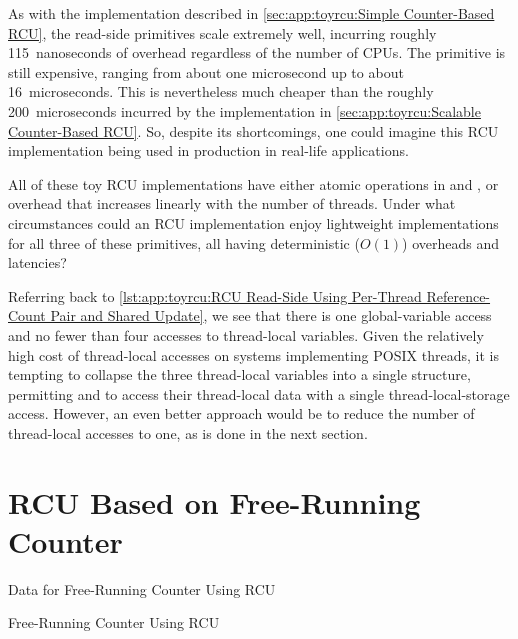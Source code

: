 As with the implementation described in
\cref{sec:app:toyrcu:Simple Counter-Based RCU},
the read-side primitives scale extremely well, incurring roughly
115~nanoseconds of overhead regardless of the number of CPUs.
The  primitive is still expensive,
ranging from about one microsecond up to about 16~microseconds.
This is nevertheless much cheaper than the roughly 200~microseconds
incurred by the implementation in
\cref{sec:app:toyrcu:Scalable Counter-Based RCU}.
So, despite its shortcomings, one could imagine this
RCU implementation being used in production in real-life applications.

\QuickQuiz{}
	All of these toy RCU implementations have either atomic operations
	in  and ,
	or 
	overhead that increases linearly with the number of threads.
	Under what circumstances could an RCU implementation enjoy
	lightweight implementations for all three of these primitives,
	all having deterministic ($O\left(1\right)$) overheads and latencies?
 \QuickQuizEnd

Referring back to
\cref{lst:app:toyrcu:RCU Read-Side Using Per-Thread Reference-Count Pair and Shared Update},
we see that there is one global-variable access and no fewer than four
accesses to thread-local variables.
Given the relatively high cost of thread-local accesses on systems
implementing POSIX threads, it is tempting to collapse the three
thread-local variables into a single structure, permitting
 and  to access their
thread-local data with a single thread-local-storage access.
However, an even better approach would be to reduce the number of
thread-local accesses to one, as is done in the next section.

\section{RCU Based on Free-Running Counter}
\label{sec:app:toyrcu:RCU Based on Free-Running Counter}

\begin{listing}[tbp]

\caption{Data for Free-Running Counter Using RCU}
\label{lst:app:toyrcu:Data for Free-Running Counter Using RCU}
\end{listing}

\begin{listing}[tbp]
\vspace*{-11pt}
\caption{Free-Running Counter Using RCU}
\label{lst:app:toyrcu:Free-Running Counter Using RCU}
\end{listing}

